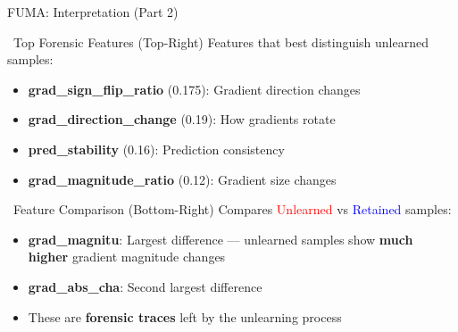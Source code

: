 \documentclass[aspectratio=169, 11pt]{beamer}
\begin{document}
\begin{frame}{FUMA: Interpretation (Part 2)}
    \begin{block}{\faSearchPlus\ Top Forensic Features (Top-Right)}
        Features that best distinguish unlearned samples:
        \begin{itemize}
            \item \textbf{grad\_sign\_flip\_ratio} (0.175): Gradient direction changes
            \item \textbf{grad\_direction\_change} (0.19): How gradients rotate
            \item \textbf{pred\_stability} (0.16): Prediction consistency
            \item \textbf{grad\_magnitude\_ratio} (0.12): Gradient size changes
        \end{itemize}
    \end{block}
    
    \vspace{0.3em}
    \begin{exampleblock}{\faChartBar\ Feature Comparison (Bottom-Right)}
        Compares \textcolor{red}{Unlearned} vs \textcolor{blue}{Retained} samples:
        \begin{itemize}
            \item \textbf{grad\_magnitu}: Largest difference --- unlearned samples show \textbf{much higher} gradient magnitude changes
            \item \textbf{grad\_abs\_cha}: Second largest difference
            \item These are \textbf{forensic traces} left by the unlearning process
        \end{itemize}
    \end{exampleblock}
\end{frame}
\end{document}
